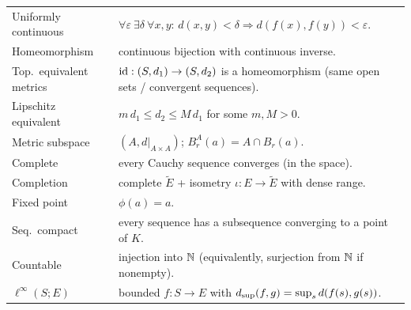 \begin{center}
\begin{longtable}{@{}p{3.4cm}p{12.6cm}@{}}
Uniformly continuous & $\forall\varepsilon\ \exists\delta\ \forall x,y$: $d(x,y)<\delta\Rightarrow d(f(x),f(y))<\varepsilon$.\\
Homeomorphism & continuous bijection with continuous inverse.\\
Top.\ equivalent metrics & $\operatorname{id}:(S,d_1)\to(S,d_2)$ is a homeomorphism (same open sets / convergent sequences).\\
Lipschitz equivalent & $m\,d_1\le d_2\le M\,d_1$ for some $m,M>0$.\\
Metric subspace & $(A,d|_{A\times A})$; $B^A_r(a)=A\cap B_r(a)$.\\
Complete & every Cauchy sequence converges (in the space).\\
Completion & complete $\tilde E$ + isometry $\iota:E\to\tilde E$ with dense range.\\
Fixed point & $\phi(a)=a$.\\
Seq.\ compact & every sequence has a subsequence converging to a point of $K$.\\
Countable & injection into $\mathbb N$ (equivalently, surjection from $\mathbb N$ if nonempty).\\
$\ell^\infty(S;E)$ & bounded $f:S\to E$ with $d_{\sup}(f,g)=\sup_sd(f(s),g(s))$.\\\bottomrule
\end{longtable}
\end{center}

